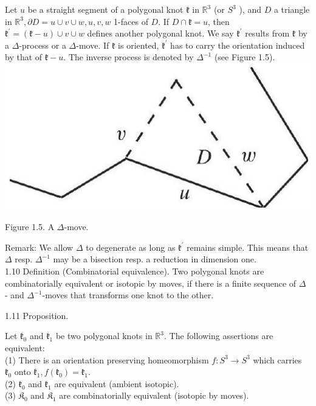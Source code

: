 \documentclass[10pt, letterpaper]{article}
\begin{document}
Let $u$ be a straight segment of a polygonal knot $\mathfrak{k}$ in $\mathbb{R}^{3}$ (or $S^{3}$ ), and $D$ a triangle in $\mathbb{R}^{3}, \partial D=u \cup v \cup w, u, v, w$ 1-faces of $D$. If $D \cap \mathfrak{k}=u$, then $\mathfrak{k}^{\prime}=(\mathfrak{k}-u) \cup v \cup w$ defines another polygonal knot. We say $\mathfrak{k}^{\prime}$ results from $\mathfrak{k}$ by a $\Delta$-process or a $\Delta$-move. If $\mathfrak{k}$ is oriented, $\mathfrak{k}^{\prime}$ has to carry the orientation induced by that of $\mathfrak{k}-u$. The inverse process is denoted by $\Delta^{-1}$ (see Figure 1.5).\\
\includegraphics[scale=0.2]{2025_05_21_9c06be8de7a55410f8c1g-021}

Figure 1.5. A $\Delta$-move.

Remark: We allow $\Delta$ to degenerate as long as $\mathfrak{k}^{\prime}$ remains simple. This means that $\Delta$ resp. $\Delta^{-1}$ may be a bisection resp. a reduction in dimension one.\\
1.10 Definition (Combinatorial equivalence). Two polygonal knots are combinatorially equivalent or isotopic by moves, if there is a finite sequence of $\Delta$ - and $\Delta^{-1}$-moves that transforms one knot to the other.

1.11 Proposition. 

Let $\mathfrak{k}_{0}$ and $\mathfrak{k}_{1}$ be two polygonal knots in $\mathbb{R}^{3}$. The following assertions are equivalent:\\
(1) There is an orientation preserving homeomorphism $f: S^{3} \rightarrow S^{3}$ which carries $\mathfrak{k}_{0}$ onto $\mathfrak{k}_{1}, f\left(\mathfrak{k}_{0}\right)=\mathfrak{k}_{1}$.\\
(2) $\mathfrak{k}_{0}$ and $\mathfrak{k}_{1}$ are equivalent (ambient isotopic).\\
(3) $\mathfrak{K}_{0}$ and $\mathfrak{K}_{1}$ are combinatorially equivalent (isotopic by moves).
\end{document}
